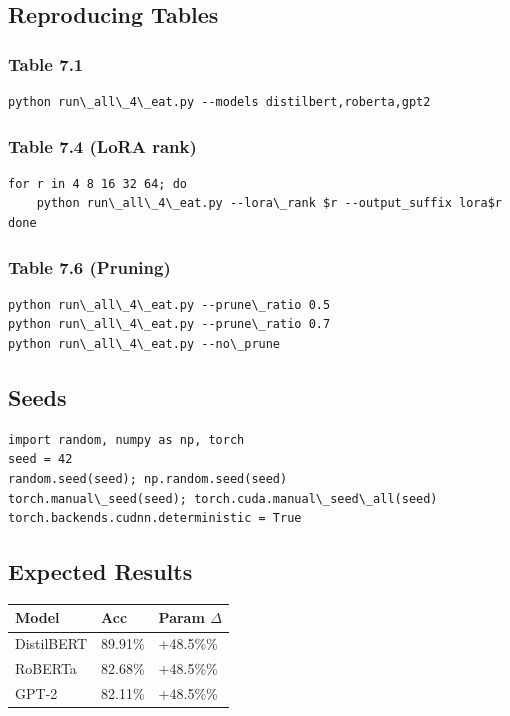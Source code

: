 \subsection{Reproducing Tables}

\subsubsection{Table 7.1}

\begin{lstlisting}
python run\_all\_4\_eat.py --models distilbert,roberta,gpt2
\end{lstlisting}

\subsubsection{Table 7.4 (LoRA rank)}

\begin{lstlisting}
for r in 4 8 16 32 64; do
    python run\_all\_4\_eat.py --lora\_rank $r --output_suffix lora$r
done
\end{lstlisting}

\subsubsection{Table 7.6 (Pruning)}

\begin{lstlisting}
python run\_all\_4\_eat.py --prune\_ratio 0.5
python run\_all\_4\_eat.py --prune\_ratio 0.7
python run\_all\_4\_eat.py --no\_prune
\end{lstlisting}

\subsection{Seeds}

\begin{lstlisting}
import random, numpy as np, torch
seed = 42
random.seed(seed); np.random.seed(seed)
torch.manual\_seed(seed); torch.cuda.manual\_seed\_all(seed)
torch.backends.cudnn.deterministic = True
\end{lstlisting}

\subsection{Expected Results}

\begin{table}[H]
\centering
\small
\begin{tabular}{lll}
\toprule
\textbf{Model} & \textbf{Acc} & \textbf{Param $\Delta$} \\
\midrule
DistilBERT & 89.91\% & +48.5\%\% \\
RoBERTa & 82.68\% & +48.5\%\% \\
GPT-2 & 82.11\% & +48.5\%\% \\
\bottomrule
\end{tabular}
\end{table}

